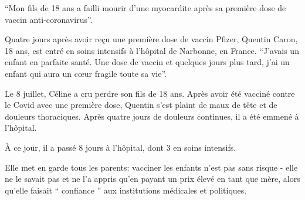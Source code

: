 “Mon fils de 18 ans a failli mourir d'une myocardite après sa première dose de
vaccin anti-coronavirus”.

Quatre jours après avoir reçu une première dose de vaccin Pfizer, Quentin Caron,
18 ans, est entré en soins intensifs à l'hôpital de Narbonne, en
France. “J'avais un enfant en parfaite santé. Une dose de vaccin et quelques
jours plus tard, j'ai un enfant qui aura un cœur fragile toute sa vie”.

Le 8 juillet, Céline a cru perdre son fils de 18 ans. Après avoir été vacciné
contre le Covid avec une première dose, Quentin s'est plaint de maux de tête et
de douleurs thoraciques. Après quatre jours de douleurs continues, il a été
emmené à l'hôpital.

À ce jour, il a passé 8 jours à l'hôpital, dont 3 en soins intensifs.

Elle met en garde tous les parents: vacciner les enfants n'est pas sans risque -
elle ne le savait pas et ne l'a appris qu'en payant un prix élevé en tant que
mère, alors qu'elle faisait “ confiance ” aux institutions médicales et
politiques.


